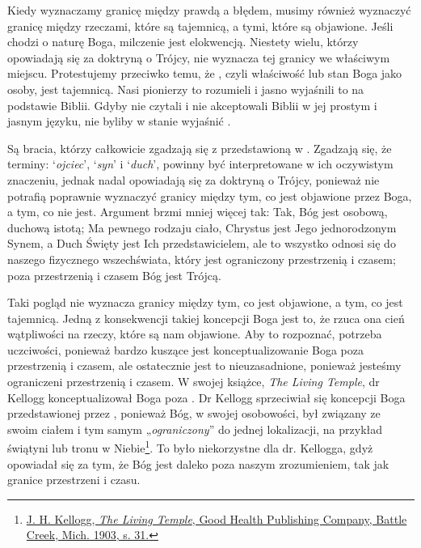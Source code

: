 Kiedy wyznaczamy granicę między prawdą a błędem, musimy również wyznaczyć granicę między rzeczami, które są tajemnicą, a tymi, które są objawione. Jeśli chodzi o naturę Boga, milczenie jest elokwencją. Niestety wielu, którzy opowiadają się za doktryną o Trójcy, nie wyznacza tej granicy we właściwym miejscu. Protestujemy przeciwko temu, że , czyli właściwość lub stan Boga jako osoby, jest tajemnicą. Nasi pionierzy to rozumieli i jasno wyjaśnili to na podstawie Biblii. Gdyby nie czytali i nie akceptowali Biblii w jej prostym i jasnym języku, nie byliby w stanie wyjaśnić .

Są bracia, którzy całkowicie zgadzają się z  przedstawioną w . Zgadzają się, że terminy: ‘\textit{ojciec}’, ‘\textit{syn}’ i ‘\textit{duch}’, powinny być interpretowane w ich oczywistym znaczeniu, jednak nadal opowiadają się za doktryną o Trójcy, ponieważ nie potrafią poprawnie wyznaczyć granicy między tym, co jest objawione przez Boga, a tym, co nie jest. Argument brzmi mniej więcej tak: Tak, Bóg jest osobową, duchową istotą; Ma pewnego rodzaju ciało, Chrystus jest Jego jednorodzonym Synem, a Duch Święty jest Ich przedstawicielem, ale to wszystko odnosi się do naszego fizycznego wszechświata, który jest ograniczony przestrzenią i czasem; poza przestrzenią i czasem Bóg jest Trójcą.

Taki pogląd nie wyznacza granicy między tym, co jest objawione, a tym, co jest tajemnicą. Jedną z konsekwencji takiej koncepcji Boga jest to, że rzuca ona cień wątpliwości na rzeczy, które są nam objawione. Aby to rozpoznać, potrzeba uczciwości, ponieważ bardzo kuszące jest konceptualizowanie Boga poza przestrzenią i czasem, ale ostatecznie jest to nieuzasadnione, ponieważ jesteśmy ograniczeni przestrzenią i czasem. W swojej książce, \textit{The Living Temple}, dr Kellogg konceptualizował Boga poza . Dr Kellogg sprzeciwiał się koncepcji Boga przedstawionej przez , ponieważ Bóg, w swojej osobowości, był związany ze swoim ciałem i tym samym „\textit{ograniczony}” do jednej lokalizacji, na przykład świątyni lub tronu w Niebie\footnote{\href{https://archive.org/details/J.H.Kellogg.TheLivingTemple1903/page/n31/mode/2up}{J. H. Kellogg, \textit{The Living Temple}, Good Health Publishing Company, Battle Creek, Mich. 1903, s. 31.}}. To było niekorzystne dla dr. Kellogga, gdyż opowiadał się za tym, że Bóg jest daleko poza naszym zrozumieniem, tak jak granice przestrzeni i czasu.

